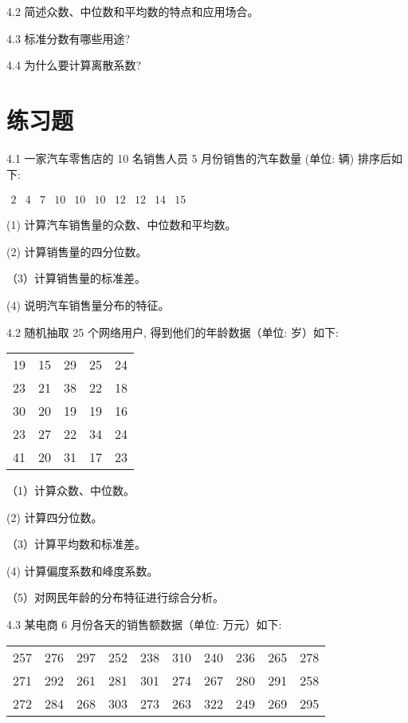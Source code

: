 \documentclass[10pt]{article}
\begin{document}
\begin{CJK*}{UTF8}{bsmi}
4.2 简述众数、中位数和平均数的特点和应用场合。

4.3 标准分数有哪些用途?

4.4 为什么要计算离散系数?

\section*{练习题}
4.1 一家汽车零售店的 10 名销售人员 5 月份销售的汽车数量 (单位: 辆) 排序后如下:

$\begin{array}{llllllllll}2 & 4 & 7 & 10 & 10 & 10 & 12 & 12 & 14 & 15\end{array}$

(1) 计算汽车销售量的众数、中位数和平均数。

(2) 计算销售量的四分位数。

（3）计算销售量的标准差。

(4) 说明汽车销售量分布的特征。

4.2 随机抽取 25 个网络用户, 得到他们的年龄数据（单位: 岁）如下:

\begin{center}
\begin{tabular}{lllll}
\hline
19 & 15 & 29 & 25 & 24 \\
23 & 21 & 38 & 22 & 18 \\
30 & 20 & 19 & 19 & 16 \\
23 & 27 & 22 & 34 & 24 \\
41 & 20 & 31 & 17 & 23 \\
\hline
\end{tabular}
\end{center}

（1）计算众数、中位数。

(2) 计算四分位数。

（3）计算平均数和标准差。

(4) 计算偏度系数和峰度系数。

（5）对网民年龄的分布特征进行综合分析。

4.3 某电商 6 月份各天的销售额数据（单位: 万元）如下:

\begin{center}
\begin{tabular}{llllllllll}
\hline
257 & 276 & 297 & 252 & 238 & 310 & 240 & 236 & 265 & 278 \\
271 & 292 & 261 & 281 & 301 & 274 & 267 & 280 & 291 & 258 \\
272 & 284 & 268 & 303 & 273 & 263 & 322 & 249 & 269 & 295 \\
\hline
\end{tabular}
\end{center}


\end{CJK*}
\end{document}
